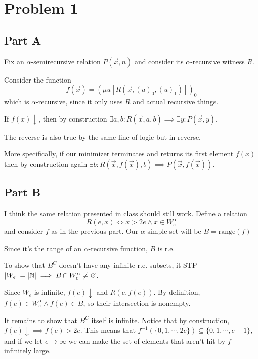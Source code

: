 \documentclass[12pt]{article}
\begin{document}
\section{Problem 1}

\subsection{Part A}

Fix an $\alpha$-semirecursive relation $P(\vec{x}, n)$ and consider its $\alpha$-recursive witness $R$.

Consider the function
\[f(\vec{x})=(\mu u[R(\vec{x}, (u)_0, (u)_1)])_0\]
which is $\alpha$-recursive, since it only uses $R$ and actual recursive things.

If $f(x)\downarrow$, then by construction $\exists a, b: R(\vec{x}, a, b) \implies \exists y: P(\vec{x}, y)$.

The reverse is also true by the same line of logic but in reverse.

More specifically, if our minimizer terminates and returns its first element $f(x)$ then
by construction again $\exists b: R(\vec{x}, f(\vec{x}), b) \implies P(\vec{x}, f(\vec{x}))$.

\subsection{Part B}

I think the same relation presented in class should still work.
Define a relation
\[R(e, x) \iff x > 2e \land x \in W^\alpha_e\]
and consider $f$ as in the previous part.
Our $\alpha$-simple set will be $B=\text{range}(f)$

Since it's the range of an $\alpha$-recursive function, $B$ is r.e.

To show that $B^C$ doesn't have any infinite r.e. subsets,
it STP $|W_e|=|\mathbb{N}| \implies B \cap W^\alpha_e \ne \varnothing$.

Since $W_e$ is infinite, $f(e)\downarrow$ and $R(e, f(e))$.
By definition, $f(e) \in W^\alpha_e \land f(e) \in B$, so their intersection is nonempty.

It remains to show that $B^C$ itself is infinite.
Notice that by construction, $f(e)\downarrow \implies f(e) > 2e$.
This means that $f^{-1}(\{0, 1, \cdots, 2e\}) \subseteq \{0, 1, \cdots, e-1\}$,
and if we let $e \to \infty$ we can make the set of elements that aren't hit by $f$
infinitely large.

\pagebreak
\end{document}
